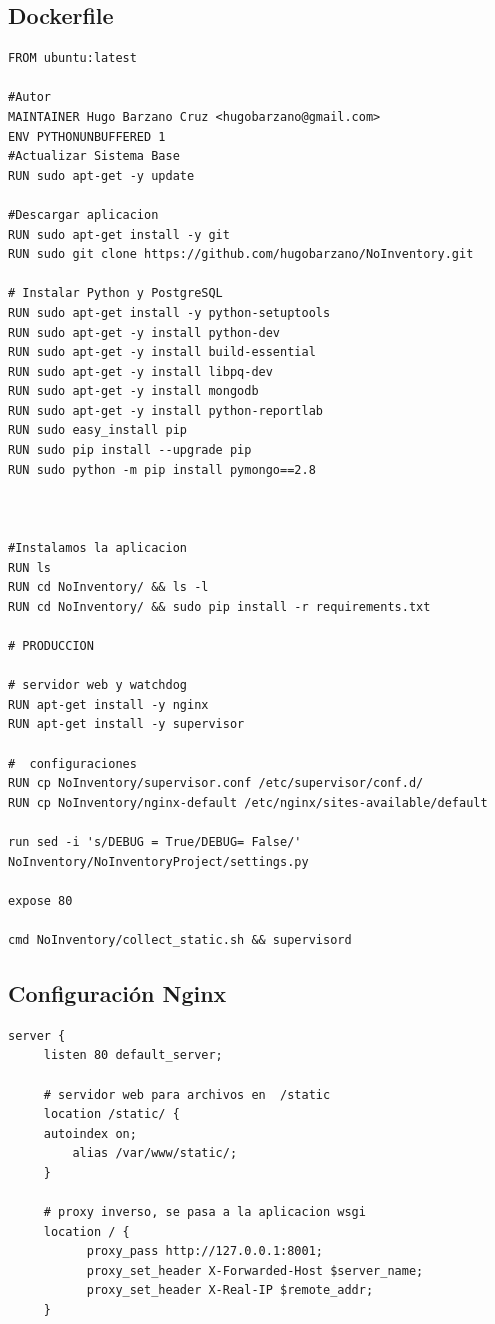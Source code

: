 \documentclass[a4paper,11pt]{book}
\begin{document}
\subsection{Dockerfile}\label{sec:dockerfile}
\begin{lstlisting}
FROM ubuntu:latest

#Autor
MAINTAINER Hugo Barzano Cruz <hugobarzano@gmail.com>
ENV PYTHONUNBUFFERED 1
#Actualizar Sistema Base
RUN sudo apt-get -y update

#Descargar aplicacion
RUN sudo apt-get install -y git
RUN sudo git clone https://github.com/hugobarzano/NoInventory.git

# Instalar Python y PostgreSQL
RUN sudo apt-get install -y python-setuptools
RUN sudo apt-get -y install python-dev
RUN sudo apt-get -y install build-essential
RUN sudo apt-get -y install libpq-dev
RUN sudo apt-get -y install mongodb
RUN sudo apt-get -y install python-reportlab
RUN sudo easy_install pip
RUN sudo pip install --upgrade pip
RUN sudo python -m pip install pymongo==2.8



#Instalamos la aplicacion
RUN ls
RUN cd NoInventory/ && ls -l
RUN cd NoInventory/ && sudo pip install -r requirements.txt

# PRODUCCION

# servidor web y watchdog
RUN apt-get install -y nginx
RUN apt-get install -y supervisor

#  configuraciones
RUN cp NoInventory/supervisor.conf /etc/supervisor/conf.d/
RUN cp NoInventory/nginx-default /etc/nginx/sites-available/default

run sed -i 's/DEBUG = True/DEBUG= False/' NoInventory/NoInventoryProject/settings.py

expose 80

cmd NoInventory/collect_static.sh && supervisord
\end{lstlisting}

\subsection{Configuración Nginx}\label{sec:nginx}
\begin{lstlisting}
server {
     listen 80 default_server;

     # servidor web para archivos en  /static
     location /static/ {
     autoindex on;
		 alias /var/www/static/;
	 }

     # proxy inverso, se pasa a la aplicacion wsgi
     location / {
           proxy_pass http://127.0.0.1:8001;
           proxy_set_header X-Forwarded-Host $server_name;
           proxy_set_header X-Real-IP $remote_addr;
     }
\end{lstlisting}
\end{document}

